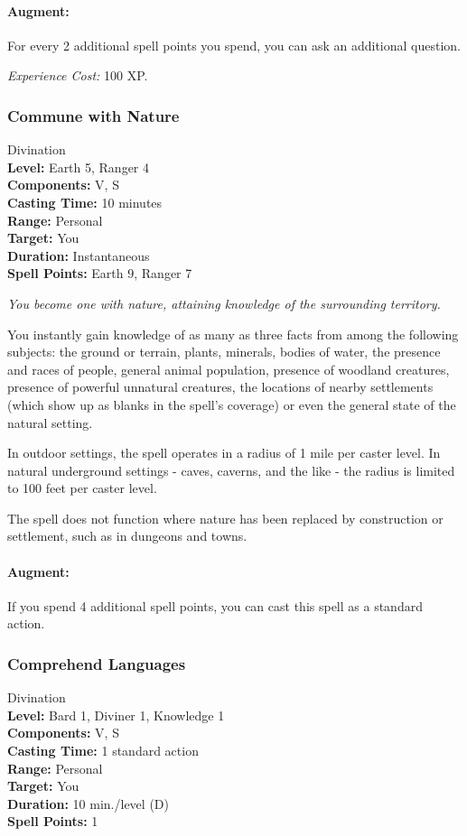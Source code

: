 \paragraph{Augment:} For every 2 additional spell points you spend, 
you can ask an additional question.

\emph{Experience Cost:} 100 XP.

\subsubsection{Commune with Nature}
\label{Spell:CommuneWithNature}
Divination
\\ \textbf{Level:} Earth 5, Ranger 4
\\ \textbf{Components:} V, S
\\ \textbf{Casting Time:} 10 minutes
\\ \textbf{Range:} Personal
\\ \textbf{Target:} You
\\ \textbf{Duration:} Instantaneous
\\ \textbf{Spell Points:} Earth 9, Ranger 7

\emph{You become one with nature, attaining knowledge of the surrounding territory.} 

You instantly gain knowledge of as many as three facts from among the following subjects: the ground or terrain, plants, minerals, bodies of water, the presence and races of people, general animal population, presence of woodland creatures, presence of powerful unnatural creatures, the locations of nearby settlements (which show up as blanks in the spell's coverage) or even the general state of the natural setting.

In outdoor settings, the spell operates in a radius of 1 mile per caster level. 
In natural underground settings - caves, caverns, and the like - the radius is limited to 100 feet per caster level.

The spell does not function where nature has been replaced by construction or settlement, such as in dungeons and towns.

\paragraph{Augment:} If you spend 4 additional spell points, you can cast this spell as a standard action.
\subsubsection{Comprehend Languages}
\label{Spell:ComprehendLanguages}
Divination
\\ \textbf{Level:} Bard 1, Diviner 1, Knowledge 1
\\ \textbf{Components:} V, S
\\ \textbf{Casting Time:} 1 standard action
\\ \textbf{Range:} Personal
\\ \textbf{Target:} You
\\ \textbf{Duration:} 10 min./level (D)
\\ \textbf{Spell Points:} 1

